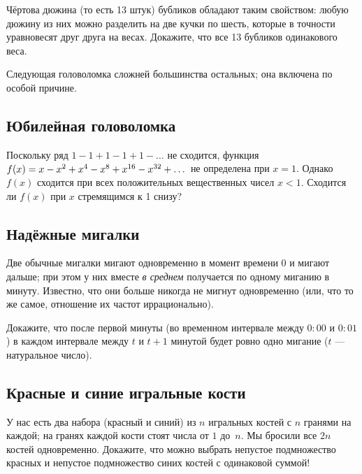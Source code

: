 Чёртова дюжина (то есть 13 штук) бубликов обладают таким свойством: любую дюжину из них можно разделить на две кучки по шесть, которые в точности уравновесят друг друга на весах.
Докажите, что все 13 бубликов одинакового веса.

\medskip

Следующая головоломка сложней большинства остальных;
она включена по особой причине.

\subsection*{Юбилейная головоломка}

Поскольку ряд $1 - 1 + 1 - 1 + 1 - \dots$ не сходится,  функция 
$f(x)\z=x-x^2+x^4-x^8+x^{16}-x^{32}+\dots$ не определена при $x=1$.
Однако $f(x)$ сходится при всех положительных вещественных чисел $x<1$.
Сходится ли $f(x)$ при $x$ стремящимся к 1 снизу?

\subsection*{Надёжные мигалки}\label{Надёжные мигалки}

Две обычные мигалки мигают одновременно в момент времени $0$
и мигают дальше; при этом у них вместе \emph{в среднем} получается по одному миганию в минуту.
Известно, что они больше никогда не мигнут одновременно (или, что то же самое, отношение их частот иррационально).

Докажите, что после первой минуты (во временном интервале между $0{:}00$ и $0{:}01$) в каждом интервале между $t$ и $t + 1$ минутой будет ровно одно мигание ($t$ --- натуральное число).

\subsection*{Красные и синие игральные кости}\label{Красные и синие игральные кости}

У нас есть два набора (красный и синий) из $n$ игральных костей с $n$ гранями на каждой;
на гранях каждой кости стоят числа от $1$ до~$n$.
Мы бросили все $2n$ костей одновременно.
Докажите, что можно выбрать непустое подмножество красных и непустое подмножество синих костей с одинаковой суммой!
